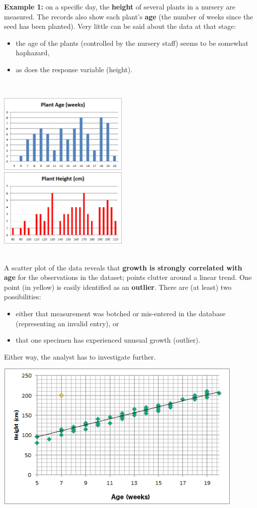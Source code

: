 \documentclass[20pt,landscape,footrule,headrule]{foils}
\newcommand{\newl}{\newline\newline}
\begin{document}
\noindent \textbf{Example 1:} on a specific day, the \textbf{height} of several plants in a nursery are measured. The records also show each plant's \textbf{age} (the number of weeks since the seed has been planted). 
\newl Very little can be said about the data at that stage: 
\begin{itemize}
\item the age of the plants (controlled by the nursery staff) seems to be somewhat haphazard, 
\item as does the response variable (height). 
\end{itemize}
\newpage\ 
\begin{center}
\includegraphics[width=0.47\textwidth]{Images/plant_age_EN}\\ 
\includegraphics[width=0.47\textwidth]{Images/plant_height_EN}
\end{center}
\newpage\ \\ \noindent A scatter plot of the data reveals that \textbf{growth is strongly correlated with age} for the observations in the dataset; points clutter around a linear trend. \newl One point (in yellow) is easily identified as an \textbf{outlier}. \newl There are (at least) two possibilities: 
\begin{itemize}
\item either that measurement was botched or mis-entered in the database (representing an invalid entry), or 
\item that one specimen has experienced unusual growth (outlier).
\end{itemize}
Either way, the analyst has to investigate further.
\newpage\ 
\begin{center}\includegraphics[width=0.90\textwidth]{Images/plant_height_vs_age_EN}\end{center} 
\end{document}
